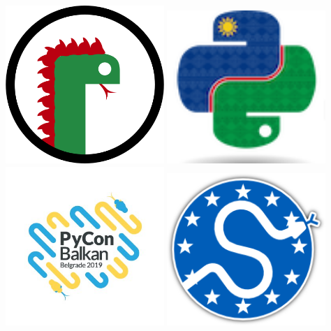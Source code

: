 \documentclass{beamer}
\begin{document}
\begin{frame}
\begin{center}
    \begin{minipage}{.45\textwidth}
        \includegraphics[width=0.45\textwidth]{static/green_snake.png}
        \includegraphics[width=0.45\textwidth]{static/logo2020.png} \vspace{.3cm} \\
        \includegraphics[width=0.45\textwidth]{static/balkan.jpg}
        \includegraphics[width=0.45\textwidth]{static/euroscipy_logo.png}
    \end{minipage} \vfill
\end{center}
\end{frame}
\end{document}
